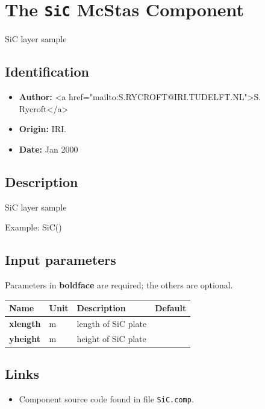 \section{The \texttt{SiC} McStas Component}
SiC layer sample

\subsection*{Identification}
\begin{itemize}
  \item \textbf{Author:} \textless{}a href="mailto:S.RYCROFT@IRI.TUDELFT.NL"\textgreater{}S. Rycroft\textless{}/a\textgreater{}
  \item \textbf{Origin:} IRI.
  \item \textbf{Date:} Jan 2000
\end{itemize}

\subsection*{Description}
SiC layer sample

Example: SiC()

\subsection*{Input parameters}
Parameters in \textbf{boldface} are required; the others are optional.

\begin{longtable}{p{}p{}p{}p{}}
\toprule
\textbf{Name} & \textbf{Unit} & \textbf{Description} & \textbf{Default} \\
\midrule
\endhead
\textbf{xlength} & m & length of SiC plate &  \\
\textbf{yheight} & m & height of SiC plate &  \\
\bottomrule
\end{longtable}

\subsection*{Links}
\begin{itemize}
  \item Component source code found in file \texttt{SiC.comp}.
\end{itemize}

